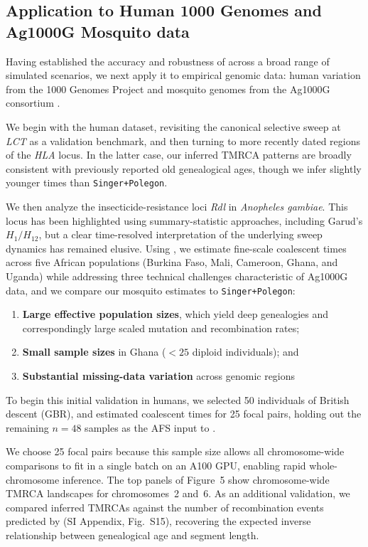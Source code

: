 \documentclass[9pt,twocolumn,twoside]{pnas-new}
\begin{document}
\subsection*{Application to Human 1000 Genomes and Ag1000G Mosquito data}



Having established the accuracy and robustness of \cxtkit across a broad range of simulated scenarios, 
we next apply it to empirical genomic data: human variation from the 1000 Genomes Project \cite{10002010map} and mosquito genomes from the Ag1000G consortium \cite{anopheles2017genetic}.

We begin with the human dataset, 
revisiting the canonical selective sweep at \emph{LCT} as a validation benchmark,
and then turning to more recently dated regions of the \emph{HLA} locus.
In the latter case,
our inferred TMRCA patterns are broadly consistent with previously reported old genealogical ages,
though we infer slightly younger times than \texttt{Singer+Polegon}. 

We then analyze the insecticide-resistance loci \emph{Rdl} in \textit{Anopheles gambiae}. 
This locus has been highlighted using summary-statistic approaches,
including Garud's $H_1/H_{12}$,
but a clear time-resolved interpretation of the underlying sweep dynamics has remained elusive. 
Using \cxtkit, we estimate fine-scale coalescent times across five African populations (Burkina Faso, Mali, Cameroon, Ghana, and Uganda) while addressing three technical challenges characteristic of Ag1000G data, and we compare our mosquito estimates to \texttt{Singer+Polegon}:

\begin{enumerate}
    \item \textbf{Large effective population sizes}, which yield deep genealogies and correspondingly large scaled mutation and recombination rates;
    \item \textbf{Small sample sizes} in Ghana (\(<25\) diploid individuals); and
    \item \textbf{Substantial missing-data variation} across genomic regions
\end{enumerate}


To begin this initial validation in humans, 
we selected 50 individuals of British descent (GBR), 
and estimated coalescent times for 25 focal pairs, 
holding out the remaining $n=48$ samples as the AFS input to \cxtkit. 


We choose 25 focal pairs 
because this sample size allows all chromosome-wide comparisons to fit in a single batch on an A100 GPU,
enabling rapid whole-chromosome inference. 
The top panels of Figure~5 
show chromosome-wide TMRCA landscapes for chromosomes~2 and~6. 
As an additional validation, 
we compared inferred TMRCAs against the number of recombination events predicted by \cxtkit (SI Appendix, Fig.~S15),
recovering the expected inverse relationship between genealogical age and segment length.
\end{document}

